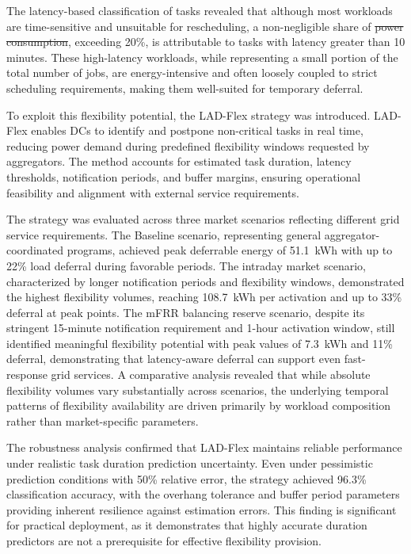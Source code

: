 \documentclass[preprint,12pt]{elsarticle}
\makeatletter
\providecommand{\DIFaddtex}[1]{{\protect\color{blue}\uwave{#1}}} %
\providecommand{\DIFdeltex}[1]{{\protect\color{red}\sout{#1}}} %
\providecommand{\DIFaddbegin}{} %
\providecommand{\DIFaddend}{} %
\providecommand{\DIFdelbegin}{} %
\providecommand{\DIFdelend}{} %
\providecommand{\DIFadd}[1]{\texorpdfstring{\DIFaddtex{#1}}{#1}} %
\providecommand{\DIFdel}[1]{\texorpdfstring{\DIFdeltex{#1}}{}} %
\providecommand{\DIFscaledelfig}{0.5}
\newlength{\DIFdelgraphicswidth} %
\newlength{\DIFdelgraphicsheight} %
\providecommand{\DIFaddincludegraphics}[2][]{{\color{blue}\fbox{\DIFOincludegraphics[#1]{#2}}}} %
\providecommand{\DIFdelincludegraphics}[2][]{%
\sbox{\DIFdelgraphicsbox}{\DIFOincludegraphics[#1]{#2}}%
\settoboxwidth{\DIFdelgraphicswidth}{\DIFdelgraphicsbox} %
\settoboxtotalheight{\DIFdelgraphicsheight}{\DIFdelgraphicsbox} %
\scalebox{\DIFscaledelfig}{%
\parbox[b]{\DIFdelgraphicswidth}{\usebox{\DIFdelgraphicsbox}\\[-\baselineskip] \rule{\DIFdelgraphicswidth}{0em}}\llap{\resizebox{\DIFdelgraphicswidth}{\DIFdelgraphicsheight}{%
\setlength{\unitlength}{\DIFdelgraphicswidth}%
\begin{picture}(1,1)%
\thicklines\linethickness{2pt} %
{\color[rgb]{1,0,0}\put(0,0){\framebox(1,1){}}}%
{\color[rgb]{1,0,0}\put(0,0){\line( 1,1){1}}}%
{\color[rgb]{1,0,0}\put(0,1){\line(1,-1){1}}}%
\end{picture}%
}\hspace*{3pt}}} %
} %
\DeclareRobustCommand{\DIFaddbegin}{\DIFOaddbegin \let\includegraphics\DIFaddincludegraphics} %
\DeclareRobustCommand{\DIFaddend}{\DIFOaddend \let\includegraphics\DIFOincludegraphics} %
\DeclareRobustCommand{\DIFdelbegin}{\DIFOdelbegin \let\includegraphics\DIFdelincludegraphics} %
\DeclareRobustCommand{\DIFdelend}{\DIFOaddend \let\includegraphics\DIFOincludegraphics} %
\let\sout@orig\sout %
\renewcommand{\sout}[1]{\ifmmode\text{\sout@orig{\ensuremath{#1}}}\else\sout@orig{#1}\fi} %
\makeatother
\begin{document}
The latency-based classification of tasks revealed that although most workloads are time-sensitive and unsuitable for rescheduling, a non-negligible share of \DIFdelbegin \DIFdel{power consumption}\DIFdelend \DIFaddbegin \DIFadd{estimated GPU power}\DIFaddend , exceeding 20\%, is attributable to tasks with latency greater than 10 minutes. These high-latency workloads, while representing a small portion of the total number of jobs, are energy-intensive and often loosely coupled to strict scheduling requirements, making them well-suited for temporary deferral.

To exploit this flexibility potential, the LAD-Flex strategy was introduced. LAD-Flex enables DCs to identify and postpone non-critical tasks in real time, reducing power demand during predefined flexibility windows requested by aggregators. The method accounts for estimated task duration, latency thresholds, notification periods, and buffer margins, ensuring operational feasibility and alignment with external service requirements.

The strategy was evaluated across three market scenarios reflecting different grid service requirements. The Baseline scenario, representing general aggregator-coordinated programs, achieved peak deferrable energy of 51.1~kWh with up to 22\% load deferral during favorable periods. The intraday market scenario, characterized by longer notification periods and flexibility windows, demonstrated the highest flexibility volumes, reaching 108.7~kWh per activation and up to 33\% deferral at peak points. The mFRR balancing reserve scenario, despite its stringent 15-minute notification requirement and 1-hour activation window, still identified meaningful flexibility potential with peak values of 7.3~kWh and 11\% deferral, demonstrating that latency-aware deferral can support even fast-response grid services. A comparative analysis revealed that while absolute flexibility volumes vary substantially across scenarios, the underlying temporal patterns of flexibility availability are driven primarily by workload composition rather than market-specific parameters.

The robustness analysis confirmed that LAD-Flex maintains reliable performance under realistic task duration prediction uncertainty. Even under pessimistic prediction conditions with 50\% relative error, the strategy achieved 96.3\% classification accuracy, with the overhang tolerance and buffer period parameters providing inherent resilience against estimation errors. This finding is significant for practical deployment, as it demonstrates that highly accurate duration predictors are not a prerequisite for effective flexibility provision.
\end{document}
